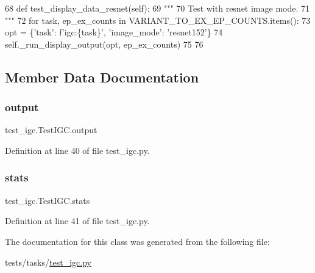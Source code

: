\begin{DoxyCode}
68     \textcolor{keyword}{def }test\_display\_data\_resnet(self):
69         \textcolor{stringliteral}{"""}
70 \textcolor{stringliteral}{        Test with resnet image mode.}
71 \textcolor{stringliteral}{        """}
72         \textcolor{keywordflow}{for} task, ep\_ex\_counts \textcolor{keywordflow}{in} VARIANT\_TO\_EX\_EP\_COUNTS.items():
73             opt = \{\textcolor{stringliteral}{'task'}: f\textcolor{stringliteral}{'igc:\{task\}'}, \textcolor{stringliteral}{'image\_mode'}: \textcolor{stringliteral}{'resnet152'}\}
74             self.\_run\_display\_output(opt, ep\_ex\_counts)
75 
76 
\end{DoxyCode}


\subsection{Member Data Documentation}
\mbox{\label{classtest__igc_1_1TestIGC_a3bc44f1296b0ba691b60952a3f1f55bb}} 
\subsubsection{\texorpdfstring{output}{output}}
{\footnotesize\ttfamily test\+\_\+igc.\+Test\+I\+G\+C.\+output\hspace{0.3cm}{\ttfamily [static]}}



Definition at line 40 of file test\+\_\+igc.\+py.

\mbox{\label{classtest__igc_1_1TestIGC_a4e3d2d771dfc83c2a941386a9f98cb64}} 
\subsubsection{\texorpdfstring{stats}{stats}}
{\footnotesize\ttfamily test\+\_\+igc.\+Test\+I\+G\+C.\+stats\hspace{0.3cm}{\ttfamily [static]}}



Definition at line 41 of file test\+\_\+igc.\+py.



The documentation for this class was generated from the following file\+:\begin{DoxyCompactItemize}
\item 
tests/tasks/\hyperlink{test__igc_8py}{test\+\_\+igc.\+py}\end{DoxyCompactItemize}

